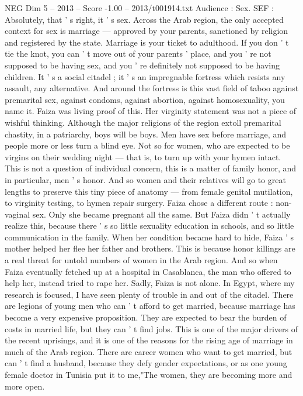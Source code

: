 \begin{textsample}{NEG Dim 5 – 2013 – Score -1.00 – 2013/t001914.txt}
Audience : Sex.
SEF : Absolutely, that ' s right, it ' s sex.
Across the Arab region, the only accepted context for sex is marriage — approved by your parents, sanctioned by religion and registered by the state.
Marriage is your ticket to adulthood.
If you don ' t tie the knot, you can ' t move out of your parents ' place, and you ' re not supposed to be having sex, and you ' re definitely not supposed to be having children.
It ' s a social citadel ; it ' s an impregnable fortress which resists any assault, any alternative.
And around the fortress is this vast field of taboo against premarital sex, against condoms, against abortion, against homosexuality, you name it.
Faiza was living proof of this.
Her virginity statement was not a piece of wishful thinking.
Although the major religions of the region extoll premarital chastity, in a patriarchy, boys will be boys.
Men have sex before marriage, and people more or less turn a blind eye.
Not so for women, who are expected to be virgins on their wedding night — that is, to turn up with your hymen intact.
This is not a question of individual concern, this is a matter of family honor, and in particular, men ' s honor.
And so women and their relatives will go to great lengths to preserve this tiny piece of anatomy — from female genital mutilation, to virginity testing, to hymen repair surgery.
Faiza chose a different route : non-vaginal sex.
Only she became pregnant all the same.
But Faiza didn ' t actually realize this, because there ' s so little sexuality education in schools, and so little communication in the family.
When her condition became hard to hide, Faiza ' s mother helped her flee her father and brothers.
This is because honor killings are a real threat for untold numbers of women in the Arab region.
And so when Faiza eventually fetched up at a hospital in Casablanca, the man who offered to help her, instead tried to rape her.
Sadly, Faiza is not alone.
In Egypt, where my research is focused, I have seen plenty of trouble in and out of the citadel.
There are legions of young men who can ' t afford to get married, because marriage has become a very expensive proposition.
They are expected to bear the burden of costs in married life, but they can ' t find jobs.
This is one of the major drivers of the recent uprisings, and it is one of the reasons for the rising age of marriage in much of the Arab region.
There are career women who want to get married, but can ' t find a husband, because they defy gender expectations, or as one young female doctor in Tunisia put it to me,"The women, they are becoming more and more open.

\end{textsample}
